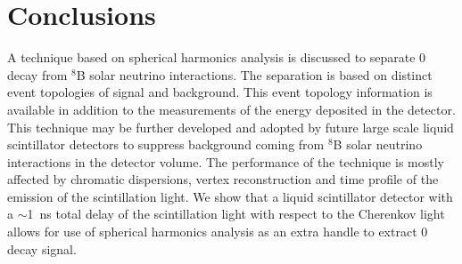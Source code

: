 \section{Conclusions}
A technique based on spherical harmonics analysis is discussed to
separate 0{\nbb} decay from $^{8}$B solar neutrino interactions. The
separation is based on distinct event topologies of signal and
background. This event topology information is available in addition
to the measurements of the energy deposited in the detector. This
technique may be further developed and adopted by future large scale
liquid scintillator detectors to suppress background coming from
$^{8}$B solar neutrino interactions in the detector volume. The
performance of the technique is mostly affected by chromatic
dispersions, vertex reconstruction and time profile of the emission of
the scintillation light. We show that a liquid scintillator detector
with a $\sim$1~ns total delay of the scintillation light with respect
to the Cherenkov light allows for use of spherical harmonics analysis
as an extra handle to extract 0{\nbb} decay signal.
